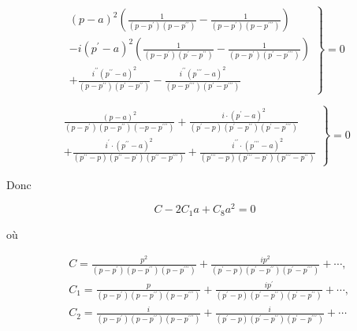 \documentclass{article}
\begin{document}
\[
\left.\begin{array}{r}
(p-a)^{2}\left(\frac{1}{\left(p-p^{\prime}\right)\left(p-p^{\prime \prime}\right)}-\frac{1}{\left(p-p^{\prime}\right)\left(p-p^{\prime \prime \prime}\right)}\right) \\
-i\left(p^{\prime}-a\right)^{2}\left(\frac{1}{\left(p-p^{\prime}\right)\left(p^{\prime}-p^{\prime \prime}\right)}-\frac{1}{\left(p-p^{\prime}\right)\left(p^{\prime}-p^{\prime \prime \prime}\right)}\right) \\
+\frac{i^{\prime \prime}\left(p^{\prime \prime}-a\right)^{2}}{\left(p-p^{\prime \prime}\right)\left(p^{\prime}-p^{\prime \prime}\right)}-\frac{i^{\prime \prime}\left(p^{\prime \prime \prime}-a\right)^{2}}{\left(p-p^{\prime \prime \prime}\right)\left(p^{\prime}-p^{\prime \prime \prime}\right)}
\end{array}\right\}=0
\]

\[
\left.\begin{array}{r}
\frac{(p-a)^{2}}{\left(p-p^{\prime}\right)\left(p-p^{\prime \prime}\right)\left(-p-p^{\prime \prime \prime}\right)}+\frac{i \cdot\left(p^{\prime}-a\right)^{2}}{\left(p^{\prime}-p\right)\left(p^{\prime}-p^{\prime \prime}\right)\left(p^{\prime}-p^{\prime \prime \prime}\right)} \\
+\frac{i^{\prime} \cdot\left(p^{\prime \prime}-a\right)^{2}}{\left(p^{\prime \prime}-p\right)\left(p^{\prime \prime}-p^{\prime}\right)\left(p^{\prime \prime}-p^{\prime \prime \prime}\right)}+\frac{i^{\prime \prime} \cdot\left(p^{\prime \prime \prime}-a\right)^{2}}{\left(p^{\prime \prime \prime}-p\right)\left(p^{\prime \prime \prime}-p^{\prime}\right)\left(p^{\prime \prime \prime}-p^{\prime \prime}\right)}
\end{array}\right\}=0
\]

Donc

\[
C-2 C_{1} a+C_{8} a^{2}=0
\]

où

\[
\begin{aligned}
& C=\frac{p^{2}}{\left(p-p^{\prime}\right)\left(p-p^{\prime \prime}\right)\left(p-p^{\prime \prime \prime}\right)}+\frac{i p^{2}}{\left(p^{\prime}-p\right)\left(p^{\prime}-p^{\prime \prime}\right)\left(p^{\prime}-p^{\prime \prime \prime}\right)}+\cdots, \\
& C_{1}=\frac{p}{\left(p-p^{\prime}\right)\left(p-p^{\prime \prime}\right)\left(p-p^{\prime \prime \prime}\right)}+\frac{i p^{\prime}}{\left(p^{\prime}-p\right)\left(p^{\prime}-p^{\prime \prime}\right)\left(p^{\prime}-p^{\prime \prime}\right)}+\cdots, \\
& C_{2}=\frac{i}{\left(p-p^{\prime}\right)\left(p-p^{\prime \prime}\right)\left(p-p^{\prime \prime \prime}\right)}+\frac{i}{\left(p^{\prime}-p\right)\left(p^{\prime}-p^{\prime \prime}\right)\left(p^{\prime}-p^{\prime \prime \prime}\right)}+\cdots
\end{aligned}
\]
\end{document}
